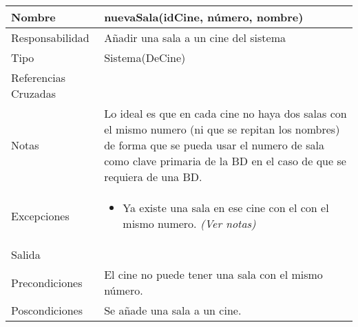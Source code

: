 \documentclass{article}
\begin{document}
\begin{table}[h]
\begin{tabular}{|l|l|l|l|l|l|}
\hline
\multicolumn{2}{|p{3cm}|}{Nombre} & \multicolumn{4}{p{10cm}|}{\textbf{nuevaSala(idCine, número, nombre)}}\\
\hline
\multicolumn{2}{|p{3cm}|}{Responsabilidad} & \multicolumn{4}{p{10cm}|}{Añadir una sala a un cine del sistema} \\
\hline
\multicolumn{2}{|p{3cm}|}{Tipo} & \multicolumn{4}{p{10cm}|}{Sistema(DeCine)} \\
\hline
\multicolumn{2}{|p{3cm}|}{Referencias Cruzadas} & \multicolumn{4}{p{10cm}|}{} \\
\hline
\multicolumn{2}{|p{3cm}|}{Notas} & \multicolumn{4}{p{10cm}|}{Lo ideal es que en cada cine no haya dos salas con el mismo numero (ni que se repitan los nombres) de forma que se pueda usar el numero de sala como clave primaria de la BD en el caso de que se requiera de una BD.} \\
\hline
\multicolumn{2}{|p{3cm}|}{Excepciones} & \multicolumn{4}{p{10cm}|}{\begin{itemize}
\item Ya existe una sala en ese cine con el con el mismo numero. \textit{(Ver notas)}
\end{itemize}} \\
\hline
\multicolumn{2}{|p{3cm}|}{Salida} & \multicolumn{4}{p{10cm}|}{} \\
\hline
\multicolumn{2}{|p{3cm}|}{Precondiciones} & \multicolumn{4}{p{10cm}|}{El cine no puede tener una sala con el mismo número.} \\
\hline
\multicolumn{2}{|p{3cm}|}{Poscondiciones} & \multicolumn{4}{p{10cm}|}{Se añade una sala a un cine.} \\
\hline
\end{tabular}
\end{table}
\end{document}
